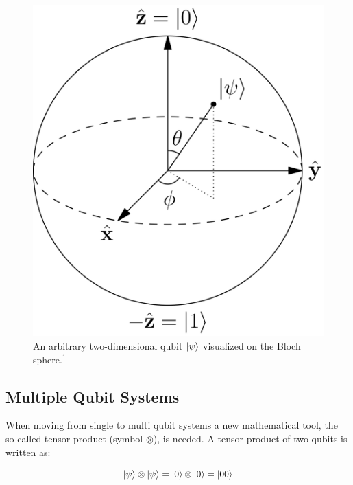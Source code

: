 \begin{figure}[!ht]
       \centering
       \includegraphics[scale=0.07]{img/blochsphere.png}
       \caption{\label{fig:blochsphere} An arbitrary two-dimensional qubit $\ket{\psi}$ visualized on the Bloch sphere.$^{1}$}
\end{figure}


\subsection{Multiple Qubit Systems}
\label{subsec:multiplequbitsystems}

When moving from single to multi qubit systems a new mathematical tool, the so-called tensor product (symbol $\otimes$), is needed. A tensor product of two qubits is written as:

\begin{equation}
\ket{\psi} \otimes \ket{\psi} = \ket{0} \otimes \ket{0} = \ket{00}
\end{equation}
 
